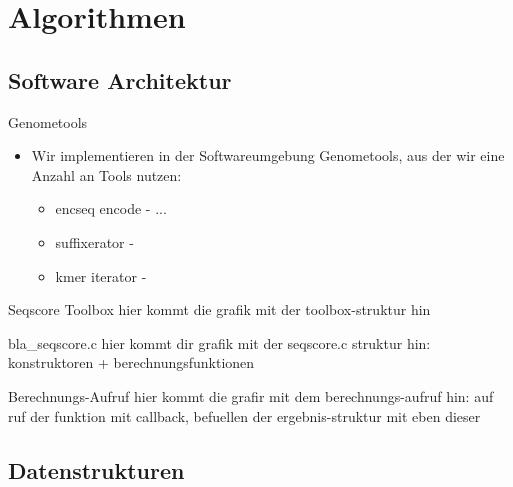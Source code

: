 \documentclass[aspectratio=1610]{beamer}
\begin{document}
\section{Algorithmen}

\subsection{Software Architektur}

\begin{frame}{Genometools}
  \begin{itemize}
    \item Wir implementieren in der Softwareumgebung Genometools, aus der wir eine Anzahl an Tools nutzen:
    \begin{itemize}
      \item encseq encode - ...
      \item suffixerator -
      \item kmer iterator -
    \end{itemize}    
  \end{itemize}
\end{frame}

\begin{frame}{Seqscore Toolbox}
  hier kommt die grafik mit der toolbox-struktur hin
\end{frame}

\begin{frame}{bla\_seqscore.c}
  hier kommt dir grafik mit der seqscore.c struktur hin: konstruktoren + berechnungsfunktionen
\end{frame}

\begin{frame}{Berechnungs-Aufruf}
  hier kommt die grafir mit dem berechnungs-aufruf hin: auf ruf der funktion mit callback, befuellen der ergebnis-struktur mit eben dieser
\end{frame}

\subsection{Datenstrukturen}
\end{document}
